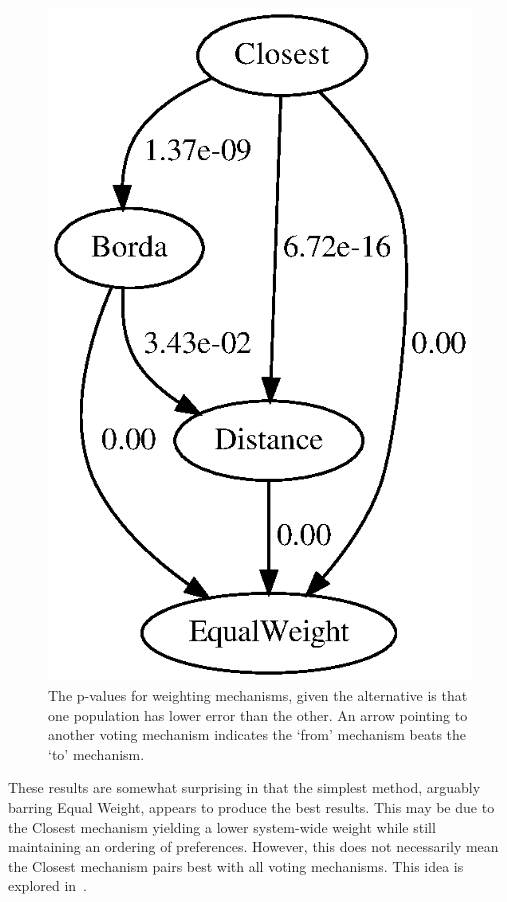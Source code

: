 \begin{figure}[htbp]
    \centering
    \includegraphics[scale=0.75]
    {./content/figures/weighting_mechanisms/weighting-mechanisms-p-values.gv}
    \caption{The p-values for weighting mechanisms, given the alternative is that one
    population has lower error than the other.
    An arrow pointing to another voting mechanism indicates the `from' mechanism
    beats the `to' mechanism.}
    \label{fig:weighting-mechanisms-p-values}
\end{figure}

These results are somewhat surprising in that the simplest method, arguably barring
Equal Weight, appears to produce the best results.
This may be due to the Closest mechanism yielding a lower system-wide weight while
still maintaining an ordering of preferences.
However, this does not necessarily mean the Closest mechanism pairs best with all
voting mechanisms.
This idea is explored in~.


